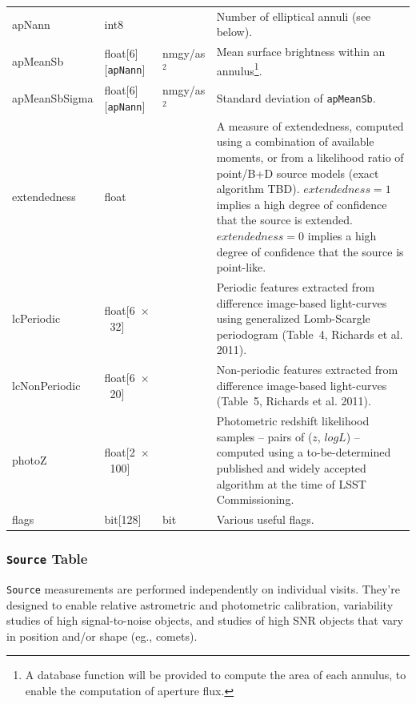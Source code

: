 \documentclass[12pt]{article}
\newcommand\x         {\hbox{$\times$}}
\newcommand{\code}[1]{\texttt{#1}}
\newcommand{\Source}{\code{Source}\xspace}
\begin{document}
\begin{center}
\begin{longtable}{p{3cm}p{2cm}p{2cm}p{5cm}}
apNann & int8 & ~ & Number of elliptical annuli (see below). \\

apMeanSb & float[6][{\tt apNann}] & nmgy/as$^2$ & Mean surface brightness within an annulus\footnote{A database function will be provided to compute the area of each annulus, to enable the computation of aperture flux.}. \\

apMeanSbSigma & float[6][{\tt apNann}] & nmgy/as$^2$ & Standard deviation of {\tt apMeanSb}. \\

extendedness & float & ~ & A measure of extendedness, computed using a combination of available moments, or from a likelihood ratio of point/B+D source models (exact algorithm TBD). $extendedness=1$ implies a high degree of confidence that the source is extended. $extendedness=0$ implies a high degree of confidence that the source is point-like. \\

lcPeriodic & float[6~\x~32] & ~ & Periodic features extracted from difference image-based light-curves using generalized Lomb-Scargle periodogram (Table~4, Richards et al. 2011).\\

lcNonPeriodic & float[6~\x~20] & ~ & Non-periodic features extracted from difference image-based light-curves (Table~5, Richards et al. 2011). \\

photoZ & float[2~\x~100] & ~ & Photometric redshift likelihood samples -- pairs of ($z$, $logL$) -- computed using a to-be-determined published and widely accepted algorithm at the time of LSST Commissioning. \\

flags & bit[128] & bit & Various useful flags. \\ \hline
\end{longtable}
\end{center}





\subsubsection{\Source Table}
\label{sec:sourceTable}

\Source measurements are performed independently on individual visits. They're designed to enable relative astrometric and photometric calibration, variability studies of high signal-to-noise objects, and studies of high SNR objects that vary in position and/or shape (eg., comets).
\end{document}
